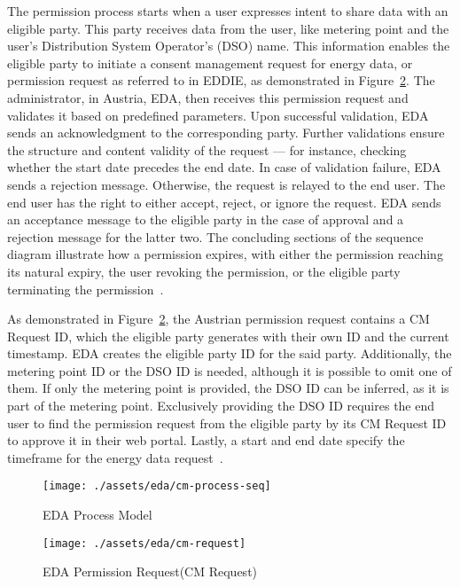 The permission process starts when a user expresses intent to share data with an eligible party.
This party receives data from the user, like metering point and the user's Distribution System Operator's (DSO) name.
This information enables the eligible party to initiate a consent management request for energy data,
or permission request as referred to in EDDIE, as demonstrated in Figure\ \ref{fig:eda-permission-request}.
The administrator, in Austria, EDA, then receives this permission request and validates it based on predefined parameters.
Upon successful validation, EDA sends an acknowledgment to the corresponding party.
Further validations ensure the structure and content validity of the request — for instance,
checking whether the start date precedes the end date.
In case of validation failure, EDA sends a rejection message.
Otherwise, the request is relayed to the end user.
The end user has the right to either accept, reject, or ignore the request.
EDA sends an acceptance message to the eligible party in the case of approval and a rejection message for the latter two.
The concluding sections of the sequence diagram illustrate how a permission expires,
with either the permission reaching its natural expiry,
the user revoking the permission, or the eligible party terminating the permission~\cite{eda,ebutilities}.

As demonstrated in Figure\ \ref{fig:eda-permission-request}, the Austrian permission request contains a CM Request ID,
which the eligible party generates with their own ID and the current timestamp.
EDA creates the eligible party ID for the said party.
Additionally, the metering point ID or the DSO ID is needed, although it is possible to omit one of them.
If only the metering point is provided, the DSO ID can be inferred, as it is part of the metering point.
Exclusively providing the DSO ID requires the end user
to find the permission request from the eligible party by its CM Request ID to approve it in their web portal.
Lastly, a start and end date specify the timeframe for the energy data request~\cite{ebutilities}.

\begin{figure}[h]
    \texttt{[image: ./assets/eda/cm-process-seq]}
    \caption{EDA Process Model}
    \label{fig:eda-process-model}
\end{figure}

\begin{figure}[h]
    \texttt{[image: ./assets/eda/cm-request]}
    \caption{EDA Permission Request(CM Request)}
    \label{fig:eda-permission-request}
\end{figure}

